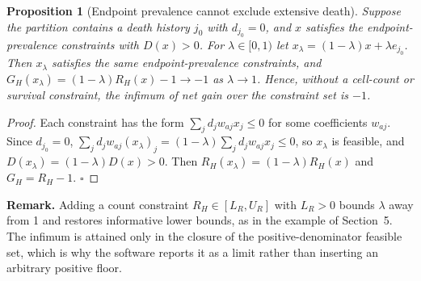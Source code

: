 \documentclass[11pt]{article}
\newtheorem{proposition}{Proposition}
\begin{document}
\begin{proposition}[Endpoint prevalence cannot exclude extensive death]
Suppose the partition contains a death history $j_0$ with $d_{j_0}=0$, and $x$ satisfies the endpoint-prevalence constraints with $D(x)>0$. For $\lambda\in[0,1)$ let $x_\lambda=(1-\lambda)x+\lambda e_{j_0}$. Then $x_\lambda$ satisfies the same endpoint-prevalence constraints, and $G_H(x_\lambda)=(1-\lambda)R_H(x)-1\to-1$ as $\lambda\to1$. Hence, without a cell-count or survival constraint, the infimum of net gain over the constraint set is $-1$.
\end{proposition}
\begin{proof}
Each constraint has the form $\sum_jd_jw_{aj}x_j\le0$ for some coefficients $w_{aj}$. Since $d_{j_0}=0$, $\sum_jd_jw_{aj}(x_\lambda)_j=(1-\lambda)\sum_jd_jw_{aj}x_j\le0$, so $x_\lambda$ is feasible, and $D(x_\lambda)=(1-\lambda)D(x)>0$. Then $R_H(x_\lambda)=(1-\lambda)R_H(x)$ and $G_H=R_H-1$. $\square$
\end{proof}

\noindent\textbf{Remark.} Adding a count constraint $R_H\in[L_R,U_R]$ with $L_R>0$ bounds $\lambda$ away from 1 and restores informative lower bounds, as in the example of Section~5. The infimum is attained only in the closure of the positive-denominator feasible set, which is why the software reports it as a limit rather than inserting an arbitrary positive floor.
\end{document}
